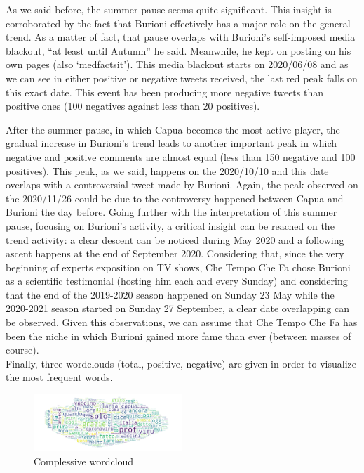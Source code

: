 \documentclass[sigchi]{acmart}
\begin{document}
 As we said before, the summer pause seems quite significant. This insight is corroborated by the fact that Burioni effectively has a major role on the general trend. As a matter of fact, that pause overlaps with Burioni’s self-imposed media blackout, “at least until Autumn” he said\cite{corriereB}. Meanwhile, he kept on posting on his own pages (also ‘medfactsit’). This media blackout starts on 2020/06/08 and as we can see in either positive or negative tweets received, the last red peak falls on this exact date. This event has been producing more negative tweets than positive ones (100 negatives against less than 20 positives).

 After the summer pause, in which Capua becomes the most active player, the gradual increase in Burioni’s trend leads to another important peak in which negative and positive comments are almost equal (less than 150 negative and 100 positives). This peak, as we said, happens on the 2020/10/10 and this date overlaps with a controversial tweet made by Burioni\cite{fattoQuot}. Again, the peak observed on the 2020/11/26 could be due to the controversy happened between Capua and Burioni the day before\cite{burioni}. Going further with the interpretation of this summer pause, focusing on Burioni’s activity, a critical insight can be reached on the trend activity: a clear descent can be noticed during May 2020 and a following ascent happens at the end of September 2020. Considering that, since the very beginning of experts exposition on TV shows, Che Tempo Che Fa chose Burioni as a scientific testimonial (hosting him each and every Sunday) and considering that the end of the 2019-2020 season happened on Sunday 23 May while the 2020-2021 season started on Sunday 27 September, a clear date overlapping can be observed. Given this observations, we can assume that Che Tempo Che Fa has been the niche in which Burioni gained more fame than ever (between masses of course).
 \\
 Finally, three wordclouds (total, positive, negative) are given in order to visualize the most frequent words.
  \begin{figure}[!htbp]
 \centering
 \includegraphics[width=0.50\textwidth]{img/Results/Wordclouds/Sentiment_All_Wordcloud.png}
 \caption{Complessive wordcloud}
 \end{figure}
\end{document}
